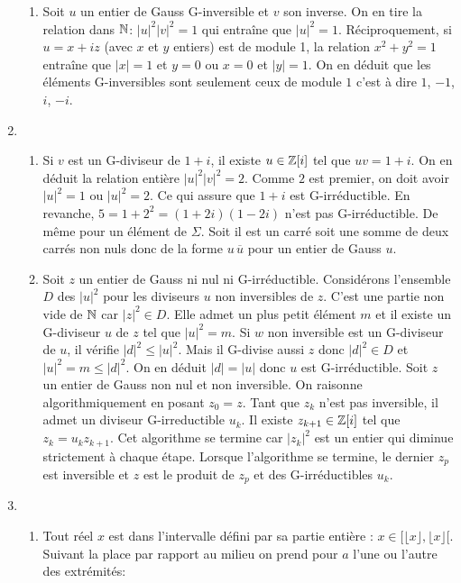 \begin{enumerate}
\begin{enumerate}
  \item Soit $u$ un entier de Gauss G-inversible et $v$ son inverse. On en tire la relation dans $\mathbb{N}$: $|u|^2 |v|^2 = 1$ qui entraîne que $|u|^2=1$. Réciproquement, si $u=x+iz$ (avec $x$ et $y$ entiers) est de module 1, la relation $x^2+y^2=1$ entraîne que $|x|=1$ et $y=0$ ou $x=0$ et $|y|=1$. On en déduit que les éléments G-inversibles sont seulement ceux de module $1$ c'est à dire $1$, $-1$, $i$, $-i$.
\end{enumerate}

\item
\begin{enumerate}
  \item Si $v$ est un G-diviseur de $1+i$, il existe $u\in \mathbb{Z}[i]$ tel que $u v = 1+i$. On en déduit la relation entière $|u|^2 |v|^2 = 2$. Comme $2$ est premier, on doit avoir $|u|^2=1$ ou $|u|^2=2$. Ce qui assure que $1+i$ est G-irréductible.\newline
  En revanche, $5 = 1 + 2^2 = (1+2i)(1-2i)$ n'est pas G-irréductible. De même pour un élément de $\Sigma$. Soit il est un carré soit une somme de deux carrés non nuls donc de la forme $u\, \overline{u}$ pour un entier de Gauss $u$.
  \item Soit $z$ un entier de Gauss ni nul ni G-irréductible. Considérons l'ensemble $D$ des $|u|^2$ pour les diviseurs $u$ non inversibles de $z$. C'est une partie non vide de $\mathbb{N}$ car $|z|^2\in D$. Elle admet un plus petit élément $m$ et il existe un G-diviseur $u$ de $z$ tel que $|u|^2 = m$. Si $w$ non inversible est un G-diviseur de $u$, il vérifie $|d|^2\leq |u|^2$. Mais il G-divise aussi $z$ donc $|d|^2\in D$ et $|u|^2 = m \leq |d|^2$. On en déduit $|d|=|u|$ donc $u$ est G-irréductible.\newline
  Soit $z$ un entier de Gauss non nul et non inversible. On raisonne algorithmiquement en posant $z_0=z$. Tant que $z_k$ n'est pas inversible, il admet un diviseur G-irreductible $u_k$. Il existe $z_{k+1}\in \mathbb{Z}[i]$ tel que $z_k=u_kz_{k+1}$.\newline
  Cet algorithme se termine car $|z_k|^2$ est un entier qui diminue strictement à chaque étape. Lorsque l'algorithme se termine, le dernier $z_p$ est inversible et $z$ est le produit de $z_p$ et des G-irréductibles $u_k$.
\end{enumerate}
\item
\begin{enumerate}
  \item Tout réel $x$ est dans l'intervalle défini par sa partie entière : $x\in [\lfloor x \rfloor , \lfloor x \rfloor[$. Suivant la place par rapport au milieu on prend pour $a$ l'une ou l'autre des extrémités:

\end{enumerate}
\end{enumerate}
